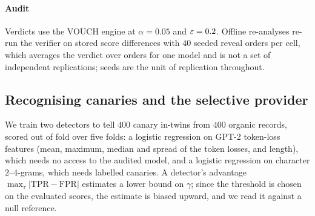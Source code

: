 \paragraph{Audit} Verdicts use the VOUCH engine at $\alpha=0.05$ and $\varepsilon=0.2$. Offline
re-analyses re-run the verifier on stored score differences with $40$ seeded reveal orders
per cell, which averages the verdict over orders for one model and is not a set of independent
replications; seeds are the unit of replication throughout.

\subsection{Recognising canaries and the selective provider}\label{sec:exp-detect}

We train two detectors to tell $400$ canary in-twins from $400$ organic records, scored out of
fold over five folds: a logistic regression on GPT-2 \citep{radford2019gpt2} token-loss
features (mean, maximum, median and spread of the token losses, and length), which needs no
access to the audited model, and a logistic regression on character $2$--$4$-grams, which
needs labelled canaries. A detector's advantage $\max_\tau|\mathrm{TPR}-\mathrm{FPR}|$
estimates a lower bound on $\gamma$; since the threshold is chosen on the evaluated scores, the
estimate is biased upward, and we read it against a null reference.

\begin{table}[t]
\centering\footnotesize\setlength{\tabcolsep}{3pt}
\caption{Detecting canaries among organic records ($400$ each, five-fold out-of-fold
scores). An advantage estimates a lower bound on $\gamma$ of Theorem~\ref{thm:detect}. A detector
with label-independent scores exceeds an advantage of $0.095$ in $5\%$ and $0.110$ in $1\%$
of $4{,}000$ simulations at this sample size.}
\label{tab:detect}
\resizebox{\columnwidth}{!}{}
\end{table}

\begin{table}[t]
\centering\footnotesize\setlength{\tabcolsep}{2.5pt}
\caption{A selective provider guided by each detector. Entries are canary miss rate (an upper
bound on the cohort advantage) / fraction of organic records left un-unlearned, at three
target miss rates; thresholds and orientation are chosen on training folds. Random selection
leaves a fraction equal to the miss rate.}
\label{tab:selective}
\resizebox{\columnwidth}{!}{}
\end{table}

